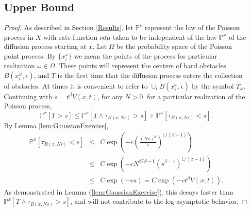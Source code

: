 \documentclass[letterpaper,oneside,english]{amsart}
\begin{document}
\subsection{Upper Bound}\label{Upper}
\begin{proof}
As described in Section \ref{Results}, let $\mathbb{P}^{\nu}$ represent the law of the Poisson process in $X$ with rate function $\nu d\mu$ taken to be independent of the law $\mathbb{P}^x$ of the diffusion process starting at $x$.  
Let $\Omega$ be the probability space of the Poisson point process.  By $\{x^{\omega}_i\}$ we mean the points of the process for particular realization $\omega\in\Omega$.  These points will represent the centers of hard obstacles $B(x^{\omega}_i,\epsilon)$, and $T$ is the first time that the diffusion process enters the collection of obstacles. At times it is convenient to refer to $\cup_i B(x^{\omega}_i,\epsilon)$ by the symbol ${\Upsilon_{\omega}}$. 
Continuing with $s=t^{\beta}V(x,t)$, for any $N>0$, for a particular realization of the Poisson process,  
\begin{equation}\label{eq:inorout}
\mathbb{P}^{x}\left[T>s\right] \le \mathbb{P}^{x}\left[T\wedge \tau_{B\left(x,Ns\right)}>s\right]+\mathbb{P}^x\left[\tau_{B\left(x,Ns\right)}<s\right].
\end{equation}
By Lemma \ref{lem:GaussianExercise}, 
\begin{eqnarray*}
 \mathbb{P}^x\left[\tau_{B\left(x,Ns\right)}<s\right] &\le & C\exp\left(-c\left(\frac{(Ns)^{\beta}}{s}\right)^{1/(\beta-1)}\right) \\
  & \le & C\exp\left(-cN^{\beta/\beta-1}\left(s^{\beta-1}\right)^{1/(\beta-1)}\right) \\
   & \le & C\exp(-cs)=C\exp(-ct^{\beta}V(x,t)).
 \end{eqnarray*} 
 As demonstrated in Lemma (\ref{lem:GaussianExercise}), this decays faster than $\mathbb{P}^{x}\left[T\wedge \tau_{B\left(x,Ns\right)}>s\right]$, and will not contribute to the log-asymptotic behavior.


\end{proof}
\end{document}
